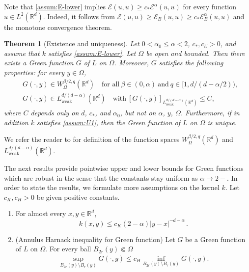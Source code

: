 \documentclass[reqno]{amsart}
\makeatletter
\newcommand{\mylabel}[2]{(#2)\def\@currentlabel{#2}\label{#1}}
\theoremstyle{plain}
\newtheorem{theorem}{Theorem}[section]
\theoremstyle{definition}
\numberwithin{equation}{section}
\newcommand{\Rd}{\mathbb{R}^d}
\newcommand{\cl} {c_{\ast}}
\newcommand{\cU} {c_U}
\newcommand{\cK} {c_K}
\newcommand{\cH} {c_H}
\makeatother
\begin{document}
Note that \eqref{assum:E-lower} implies $\mathcal{E}(u, u) \geq \cl \mathcal{E}^{\alpha}(u, u)$ for every function $u \in L^{2}(\Rd)$. Indeed, it follows from $\mathcal{E}(u, u) \geq \mathcal{E}_{B}(u, u) \geq \cl \mathcal{E}^{\alpha}_{B}(u, u)$ and the monotone convergence theorem.

\begin{theorem} [Existence and uniqueness] \label{thm:existence}
	Let $0<\alpha_0 \leq \alpha<2$, $\cl, \cU > 0$, and assume that $k$ satisfies \eqref{assum:E-lower}. Let $\Omega$ be open and bounded. Then there exists a Green function $G$ of $L$ on $\Omega$. 
	Moreover, $G$ satisfies the following properties: for every $y \in \Omega$,
	\begin{align}
	&G(\cdot, y) \in W^{\beta/2, q}_\Omega(\Rd) 
	\quad\text{for all}~ \beta \in (0, \alpha) ~\text{and}~ q \in [1, d/(d-\alpha/2)), \nonumber \\
	&G(\cdot, y) \in L^{d/(d-\alpha)}_\mathrm{weak} (\Rd) \quad\text{with}~ 
	[G(\cdot, y)]_{L^{d/(d-\alpha)}_\mathrm{weak} (\Rd)} \leq C, \label{eq:weak_Lp}
	\end{align}
	where $C$ depends only on $d$, $\cl$, and $\alpha_0$, but not on $\alpha$, $y$, $\Omega$. Furthermore, if in addition $k$ satisfies \eqref{assum:U1}, then the Green function of $L$ on $\Omega$ is unique.
\end{theorem}

We refer the reader to  for definition of the function spaces $W^{\beta/2, q}_\Omega(\Rd)$ and $L^{d/(d-\alpha)}_\mathrm{weak} (\Rd)$.

The next results provide pointwise upper and lower bounds for Green functions which are robust in the sense that the constants stay uniform as $\alpha \to 2-$. In order to state the results, we formulate more assumptions on the kernel $k$. Let $\cK, \cH> 0$ be given positive constants.
\begin{enumerate}
	\item [\mylabel{assum:U2}{U2}]
	For almost every $x, y \in \Rd$,
	\begin{equation*}
	k(x, y) \leq \cK (2-\alpha) |y-x|^{-d-\alpha} \,.
	\end{equation*}
	
	\item [\mylabel{assum:H}{H}] 
	(Annulus Harnack inequality for Green function) Let $G$ be a Green function of $L$ on $\Omega$. For every ball $B_{2r}(y) \Subset \Omega$ 
	\begin{align*}
	\sup_{B_{2r}(y) \setminus B_r(y)} G(\cdot, y) 
	\leq \cH \inf_{B_{2r}(y) \setminus B_r(y)} G(\cdot, y).
	\end{align*}
	
\end{enumerate}
\end{document}
